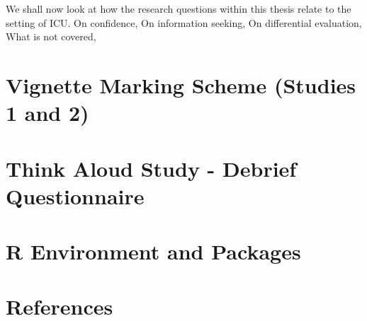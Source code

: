 \documentclass[a4paper, nobind]{templates/ociamthesis}
\newenvironment{Shaded}{\begin{snugshade}}{\end{snugshade}}
\newcommand{\CommentTok}[1]{\textcolor[rgb]{0.56,0.35,0.01}{\textit{#1}}}
\renewenvironment{Shaded}
{
  \vspace{10pt}%
  \begin{snugshade}%
}{%
  \end{snugshade}%
  \vspace{8pt}%
}
\newlength{\cslhangindent}
\newenvironment{CSLReferences}[2] %
 {%
  \setlength{\parindent}{0pt}
  \ifodd #1
  \let\oldpar\par
  \def\par{\hangindent=\cslhangindent\oldpar}
  \fi
  \setlength{\parskip}{1mm}
  \setlength{\baselineskip}{6mm}
 }%
 {}
\begin{document}
We shall now look at how the research questions within this thesis relate to the setting of ICU. On confidence,
On information seeking,
On differential evaluation,
What is not covered,

\startappendices

\hypertarget{vignette-marking-scheme-studies-1-and-2}{%
\chapter{Vignette Marking Scheme (Studies 1 and 2)}\label{vignette-marking-scheme-studies-1-and-2}}

\hypertarget{think-aloud-study---debrief-questionnaire}{%
\chapter{Think Aloud Study - Debrief Questionnaire}\label{think-aloud-study---debrief-questionnaire}}

\hypertarget{r-environment-and-packages}{%
\chapter{R Environment and Packages}\label{r-environment-and-packages}}

\begin{Shaded}
\end{Shaded}

\hypertarget{references}{%
\chapter*{References}\label{references}}


\hypertarget{refs}{}
\begin{CSLReferences}{0}{0}
\end{CSLReferences}

\end{document}
